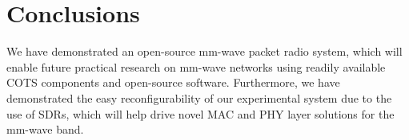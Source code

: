 \documentclass{sig-alternate}
\begin{document}
\section{Conclusions}
We have demonstrated an open-source mm-wave packet radio system, which will enable future practical research on mm-wave networks using readily available COTS components and open-source software. Furthermore, we have demonstrated the easy reconfigurability of our experimental system due to the use of SDRs, which will help drive novel MAC and PHY layer solutions for the mm-wave band.




\balancecolumns
\end{document}
